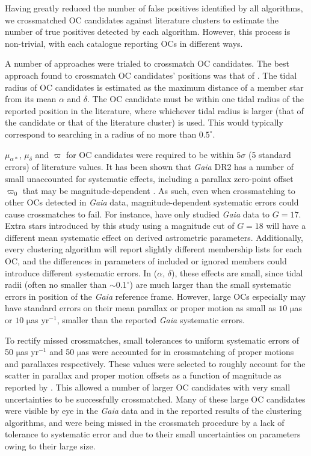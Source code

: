 Having greatly reduced the number of false positives identified by all algorithms, we crossmatched OC candidates against literature clusters to estimate the number of true positives detected by each algorithm. However, this process is non-trivial, with each catalogue reporting OCs in different ways.

A number of approaches were trialed to crossmatch OC candidates. The best approach found to crossmatch OC candidates' positions was that of \cite{liu_catalog_2019}. The tidal radius of OC candidates is estimated as the maximum distance of a member star from its mean $\alpha$ and $\delta$. The OC candidate must be within one tidal radius of the reported position in the literature, where whichever tidal radius is larger (that of the candidate or that of the literature cluster) is used. This would typically correspond to searching in a radius of no more than $0.5^\circ$.

$\mu_{\alpha*}$, $\mu_{\delta}$ and $\varpi$ for OC candidates were required to be within $5 \sigma$ (5 standard errors) of literature values. It has been shown that \emph{Gaia} DR2 has a number of small unaccounted for systematic effects, including a parallax zero-point offset $\varpi_0$ that may be magnitude-dependent \citep{lindegren_gaia_2018}. As such, even when crossmatching to other OCs detected in \emph{Gaia} data, magnitude-dependent systematic errors could cause crossmatches to fail. For instance, \cite{castro-ginard_hunting_2020} have only studied \emph{Gaia} data to $G=17$. Extra stars introduced by this study using a magnitude cut of $G=18$ will have a different mean systematic effect on derived astrometric parameters. Additionally, every clustering algorithm will report slightly different membership lists for each OC, and the differences in parameters of included or ignored members could introduce different systematic errors. In ($\alpha$, $\delta$), these effects are small, since tidal radii (often no smaller than $\sim0.1^{\circ}$) are much larger than the small systematic errors in position of the \emph{Gaia} reference frame. However, large OCs especially may have standard errors on their mean parallax or proper motion as small as $10$ $\mathrm{\mu}$as or $10$ $\mathrm{\mu}$as yr$^{-1}$, smaller than the reported \emph{Gaia} systematic errors.

To rectify missed crossmatches, small tolerances to uniform systematic errors of 50 $\mathrm{\mu}$as yr$^{-1}$ and 50 $\mathrm{\mu}$as were accounted for in crossmatching of proper motions and parallaxes respectively. These values were selected to roughly account for the scatter in parallax and proper motion offsets as a function of magnitude as reported by \cite{lindegren_gaia_2018}. This allowed a number of larger OC candidates with very small uncertainties \citep[particularly from the catalogue of][]{cantat-gaudin_clusters_2020} to be successfully crossmatched. Many of these large OC candidates were visible by eye in the \emph{Gaia} data and in the reported results of the clustering algorithms, and were being missed in the crossmatch procedure by a lack of tolerance to systematic error and due to their small uncertainties on parameters owing to their large size.

